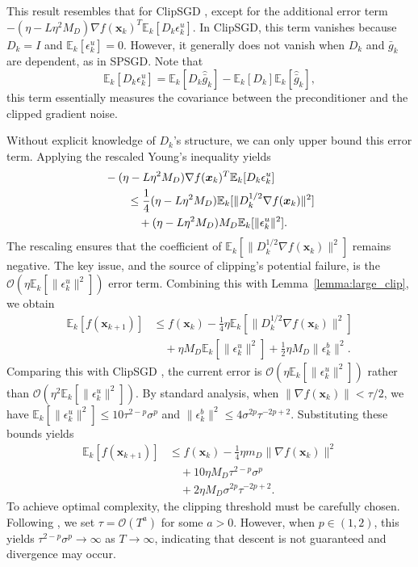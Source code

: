 \documentclass{article}
\newcommand{\bx}{\boldsymbol{x}}
\newcommand{\barg}{\bar{g}}
\theoremstyle{plain}
\theoremstyle{definition}
\theoremstyle{remark}
\begin{document}
This result resembles that for ClipSGD \cite{Zhang2020Adaptive}, except for the additional error term $-(\eta - L\eta^2 M_D)\nabla f(\bx_k)^T\mathbb{E}_k[D_k\epsilon_k^u]$. In ClipSGD, this term vanishes because $D_k = I$ and $\mathbb{E}_k[\epsilon_k^u] = 0$. However, it generally does not vanish when $D_k$ and $\barg_k$ are dependent, as in SPSGD. Note that
\begin{equation*}
    \mathbb{E}_k[D_k\epsilon_k^u] = \mathbb{E}_k[D_k\widehat{\barg}_k] - \mathbb{E}_k[D_k]\mathbb{E}_k[\widehat{\barg}_k],
\end{equation*}
this term essentially measures the covariance between the preconditioner and the clipped gradient noise.


Without explicit knowledge of $D_k$'s structure, we can only upper bound this error term. Applying the rescaled Young's inequality yields
\begin{align}\label{eq:additional_error}
    & - (\eta - L\eta^2 M_D) \nabla f(\bx_k)^T \mathbb{E}_k[ D_k \epsilon_k^u] \notag\\
    & \qquad \leq \frac{1}{4}(\eta - L\eta^2 M_D) \mathbb{E}_k[\|D_k^{1/2}\nabla f(\bx_k)\|^2] \notag \\
    & \qquad \quad + (\eta - L\eta^2 M_D) M_D \mathbb{E}_k[ \| \epsilon_k^u\|^2].
\end{align}
The rescaling ensures that the coefficient of $\mathbb{E}_k[\|D_k^{1/2}\nabla f(\bx_k)\|^2]$ remains negative. The key issue, and the source of clipping's potential failure, is the $\mathcal{O}(\eta\mathbb{E}_k[\|\epsilon_k^u\|^2])$ error term. Combining this with Lemma~\ref{lemma:large_clip}, we obtain
\begin{align*}
    \mathbb{E}_k[ f(\bx_{k+1}) ] & \le f(\bx_k) - \frac{1}{4} \eta \mathbb{E}_k[ \| D_k^{1/2}\nabla f(\bx_k)\|^2 ] \\
    & \quad + \eta M_D \mathbb{E}_k[ \| \epsilon_k^u\|^2]+ \frac{1}{2}\eta M_D  \|\epsilon_k^b\|^2 .
\end{align*}
Comparing this with ClipSGD \citep{Zhang2020Adaptive}, the current error is $\mathcal{O}(\eta\mathbb{E}_k[\|\epsilon_k^u\|^2])$ rather than $\mathcal{O}(\eta^2\mathbb{E}_k[\|\epsilon_k^u\|^2])$. By standard analysis, when $\|\nabla f(\bx_k)\| < \tau/2$, we have $\mathbb{E}_k[\|\epsilon_k^u\|^2] \leq 10\tau^{2-p}\sigma^p$ and $\|\epsilon_k^b\|^2 \leq 4\sigma^{2p}\tau^{-2p+2}$. Substituting these bounds yields
\begin{align*}
    \mathbb{E}_k[ f(\bx_{k+1}) ] & \le f(\bx_k) - \frac{1}{4} \eta m_D \|\nabla f(\bx_k)\|^2 \\
    & \quad + 10 \eta M_D \tau^{2-p}\sigma^p\\
    & \quad + 2\eta M_D \sigma^{2p}\tau^{-2p+2}.
\end{align*}
To achieve optimal complexity, the clipping threshold must be carefully chosen. Following \citet{Zhang2020Adaptive}, we set $\tau = \mathcal{O}(T^a)$ for some $a > 0$. However, when $p \in (1,2)$, this yields $\tau^{2-p}\sigma^p \to \infty$ as $T \to \infty$, indicating that descent is not guaranteed and divergence may occur.
\end{document}

